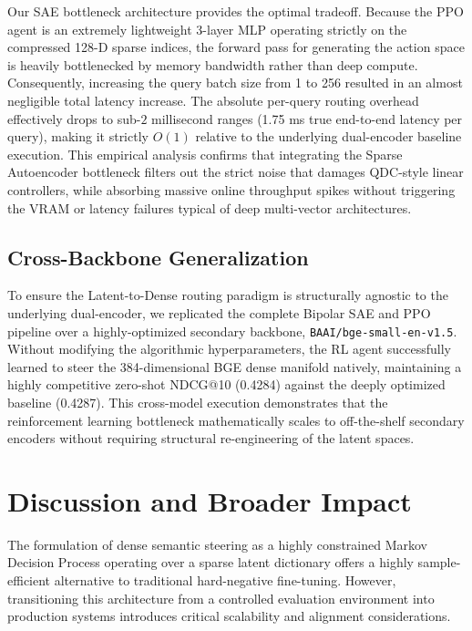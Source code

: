 Our SAE bottleneck architecture provides the optimal tradeoff. Because the PPO agent is an extremely lightweight 3-layer MLP operating strictly on the compressed 128-D sparse indices, the forward pass for generating the action space is heavily bottlenecked by memory bandwidth rather than deep compute. Consequently, increasing the query batch size from 1 to 256 resulted in an almost negligible total latency increase. The absolute per-query routing overhead effectively drops to sub-$2$ millisecond ranges (1.75 ms true end-to-end latency per query), making it strictly $O(1)$ relative to the underlying dual-encoder baseline execution. This empirical analysis confirms that integrating the Sparse Autoencoder bottleneck filters out the strict noise that damages QDC-style linear controllers, while absorbing massive online throughput spikes without triggering the VRAM or latency failures typical of deep multi-vector architectures.

\subsection{Cross-Backbone Generalization}
To ensure the Latent-to-Dense routing paradigm is structurally agnostic to the underlying dual-encoder, we replicated the complete Bipolar SAE and PPO pipeline over a highly-optimized secondary backbone, \texttt{BAAI/bge-small-en-v1.5}. Without modifying the algorithmic hyperparameters, the RL agent successfully learned to steer the 384-dimensional BGE dense manifold natively, maintaining a highly competitive zero-shot NDCG@10 (0.4284) against the deeply optimized baseline (0.4287). This cross-model execution demonstrates that the reinforcement learning bottleneck mathematically scales to off-the-shelf secondary encoders without requiring structural re-engineering of the latent spaces.

\section{Discussion and Broader Impact}
The formulation of dense semantic steering as a highly constrained Markov Decision Process operating over a sparse latent dictionary offers a highly sample-efficient alternative to traditional hard-negative fine-tuning. However, transitioning this architecture from a controlled evaluation environment into production systems introduces critical scalability and alignment considerations.

